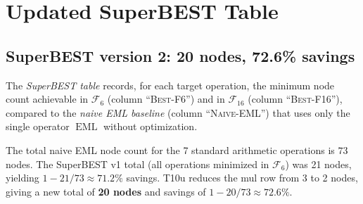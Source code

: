 \documentclass[12pt,a4paper]{article}
\theoremstyle{definition}
\newcommand{\EML}{\operatorname{EML}}
\begin{document}
\section{Updated SuperBEST Table}

\subsection{SuperBEST version 2: 20 nodes, 72.6\% savings}

The \emph{SuperBEST table} records, for each target operation, the minimum
node count achievable in $\mathcal{F}_6$ (column ``\textsc{Best-F6}'') and
in $\mathcal{F}_{16}$ (column ``\textsc{Best-F16}''), compared to the
\emph{naive EML baseline} (column ``\textsc{Naive-EML}'') that uses only the
single operator $\EML$ without optimization.

The total naive EML node count for the 7 standard arithmetic operations is
$73$ nodes.  The SuperBEST v1 total (all operations minimized in
$\mathcal{F}_6$) was 21 nodes, yielding $1 - 21/73 \approx 71.2\%$ savings.
T10u reduces the mul row from 3 to 2 nodes, giving a new total of
\textbf{20 nodes} and savings of $1-20/73\approx\mathbf{72.6\%}$.
\end{document}
